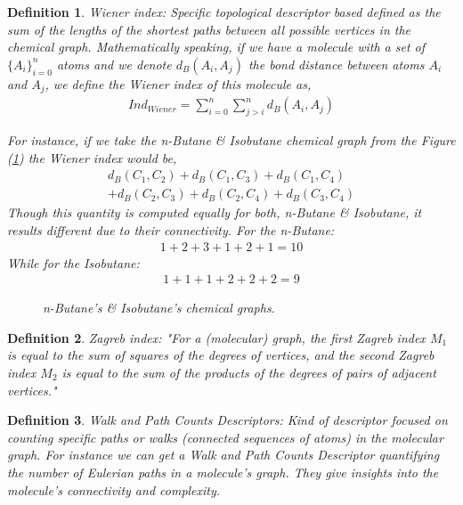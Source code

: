 \documentclass[12pt,letterpaper]{article}
\newtheorem{definition}{Definition}
\begin{document}
\begin{multicols}{2}
\begin{definition}\label{DefinitionWienerIndices}
Wiener index: Specific topological descriptor based defined as the sum of the lengths of the shortest paths between all possible vertices in the chemical graph. Mathematically speaking, if we have a molecule with a set of $\{A_i\}_{i=0}^n$ atoms and we denote $d_B(A_i,A_j)$ the bond distance between atoms $A_i$ and $A_j$, we define the Wiener index of this molecule as,
\begin{align}
Ind_{Wiener}=\sum_{i=0}^n\sum_{j>i}^nd_B(A_i,A_j)
\end{align}
\par
For instance, if we take the n-Butane \& Isobutane  chemical graph from the Figure (\ref{figurenButaneIsobutaneGraph}) the Wiener index would be,
\begin{align}
d_B(C_1,C_2)+d_B(C_1,C_3)+d_B(C_1,C_4)\\
+ d_B(C_2,C_3)+d_B(C_2,C_4)+d_B(C_3,C_4)
\end{align}
Though this quantity is computed equally for both, n-Butane \& Isobutane, it results different due to their connectivity. For the n-Butane:
\begin{align}
1+2+3+1+2+1=10
\end{align}
While for the Isobutane:
\begin{align}
1+1+1+2+2+2=9 
\end{align}
\begin{figure}[H]
\centering
{}\hspace{1cm}
\caption{n-Butane's \& Isobutane's  chemical graphs.}
\label{figurenButaneIsobutaneGraph}
\end{figure}
\end{definition}

\begin{definition}\label{DefinitionZagrebIndices}
Zagreb index: "For a (molecular) graph, the first Zagreb index $M_1$
 is equal to the sum of squares of the degrees of vertices, and the second Zagreb index $M_2$
 is equal to the sum of the products of the degrees of pairs of adjacent vertices." \cite{ZagrebIndicesArticle}
\end{definition}

\begin{definition}
Walk and Path Counts Descriptors: Kind of descriptor focused on counting specific paths or walks (connected sequences of atoms) in the molecular graph. For instance we can get a Walk and Path Counts Descriptor quantifying the number of Eulerian paths in a molecule's graph. They give insights into the molecule’s connectivity and complexity.
\end{definition}


\end{multicols}
\end{document}
